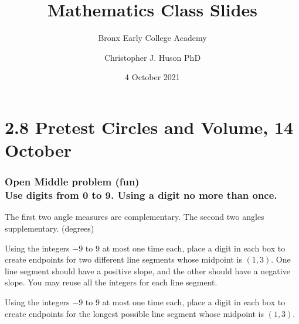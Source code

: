 \documentclass{beamer}
\title{Mathematics Class Slides}
\subtitle{Bronx Early College Academy}
\author{Christopher J. Huson PhD}
\date{4 October 2021}
\begin{document}
\frame{\titlepage}
\section[Outline]{}
\frame{\tableofcontents}

\section{2.8 Pretest Circles and Volume, 14 October}

  \frame
  {
    \frametitle{Open Middle problem (fun) \\
    Use digits from 0 to 9. Using a digit no more than once.}
      The first two angle measures are complementary. The second two angles supplementary. (degrees)\\[0.75cm]
         \vspace{5cm} 
  }

Using the integers $-9$ to 9 at most one time each, place a digit in each box to create endpoints for two different line segments whose midpoint is $(1, 3)$. One line segment should have a positive slope, and the other should have a negative slope. You may reuse all the integers for each line segment.

Using the integers $-9$ to 9 at most one time each, place a digit in each box to create endpoints for the longest possible line segment whose midpoint is $(1, 3)$.
\end{document}
